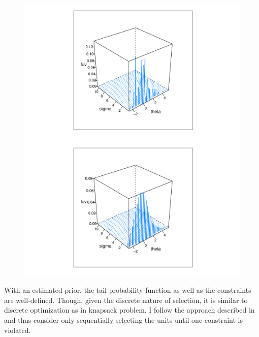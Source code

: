 \documentclass[12pt]{article}
\begin{document}
\begin{figure}[h!]
    \centering
    \begin{minipage}{0.5\textwidth}
        \centering
        \includegraphics[width=\textwidth]{../../Figures/2013-2022/GMM_m/GLVmix.pdf}
    \end{minipage}\hfill
    \begin{minipage}{0.5\textwidth}
        \centering
        \includegraphics[width=\textwidth]{../../Figures/2013-2022/GMM_m/GLVmix_s.pdf}
    \end{minipage}
\end{figure}

With an estimated prior, the tail probability function as well as the
constraints are well-defined. Though, given the discrete nature of selection,
it is similar to discrete optimization as in knapsack problem. I follow the
approach described in \cite{basu2018weighted} and thus consider only
sequentially selecting the units until one constraint is violated.
\end{document}
